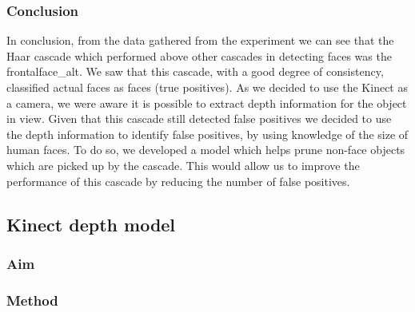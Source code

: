 \documentclass[conference]{IEEEtran}
\begin{document}
\subsubsection{Conclusion}
In conclusion, from the data gathered from the experiment we can see that the Haar cascade which performed above other cascades in detecting faces was the frontalface\_alt. We saw that this cascade, with a good degree of consistency, classified actual faces as faces (true positives). As we decided to use the Kinect as a camera, we were aware it is possible to extract depth information for the object in view. Given that this cascade still detected false positives we decided to use the depth information to identify false positives, by using knowledge of the size of human faces. To do so, we developed a model which helps prune non-face objects which are picked up by the cascade. This would allow us to improve the performance of this cascade by reducing the number of false positives.

\subsection{Kinect depth model}
\subsubsection{Aim}
\subsubsection{Method}
\end{document}
